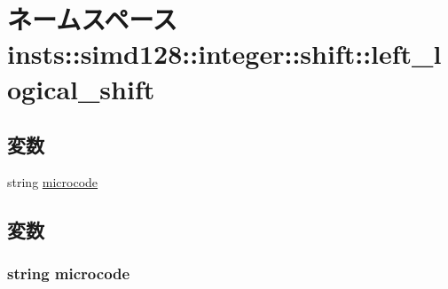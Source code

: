 \hypertarget{namespaceinsts_1_1simd128_1_1integer_1_1shift_1_1left__logical__shift}{
\section{ネームスペース insts::simd128::integer::shift::left\_\-logical\_\-shift}
\label{namespaceinsts_1_1simd128_1_1integer_1_1shift_1_1left__logical__shift}
}
\subsection*{変数}
\begin{DoxyCompactItemize}
\item 
string \hyperlink{namespaceinsts_1_1simd128_1_1integer_1_1shift_1_1left__logical__shift_a770f11a173e99389a8802f0107ed8f52}{microcode}
\end{DoxyCompactItemize}


\subsection{変数}
\hypertarget{namespaceinsts_1_1simd128_1_1integer_1_1shift_1_1left__logical__shift_a770f11a173e99389a8802f0107ed8f52}{
\subsubsection[{microcode}]{\setlength{\rightskip}{0pt plus 5cm}string {\bf microcode}}}
\label{namespaceinsts_1_1simd128_1_1integer_1_1shift_1_1left__logical__shift_a770f11a173e99389a8802f0107ed8f52}
